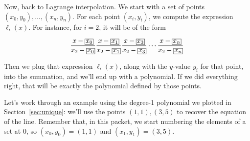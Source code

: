 \documentclass[12 pt]{article}
\newcounter{example}[section]
\begin{document}
Now, back to Lagrange interpolation. We start with a set of points $(x_0, y_0), 
\ldots,\allowbreak (x_n, y_n)$. For each point $(x_i, y_i)$, we compute the 
expression $\ell_i(x)$. For instance, for $i=2$, it will be of the form

\newcommand{\cyan}[1]{\textcolor{cyan}{#1}}
\[
    \setlength{\fboxsep}{.3\fboxsep}
    \frac{x-\boxed{x_0}}{x_2-\boxed{x_0}}
    \frac{x-\boxed{x_1}}{x_2-\boxed{x_1}}
    \frac{x-\boxed{x_3}}{x_2-\boxed{x_3}}
    \cdots
    \frac{x-\boxed{x_n}}{x_2-\boxed{x_n}}
\]

Then we plug that expression $\ell_i(x)$, along with the $y$-value $y_i$ 
for that point, into the summation, and we'll end up with a polynomial. 
If we did everything right, that will be exactly the polynomial defined 
by those points.

Let's work through an example using the degree-1 polynomial we plotted in Section~\ref{sec:unique}:
we'll use the points $(1,1), (3,5)$ to recover the equation of the line. Remember that,
in this packet, we start numbering the elements of a set at 0, so $(x_0,y_0)
= (1,1)$ and $(x_1, y_1) = (3,5)$.
\end{document}
